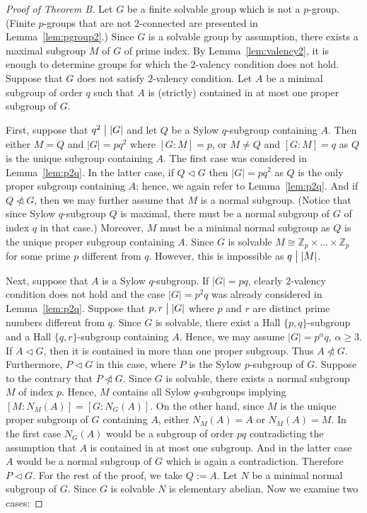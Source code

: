 \documentclass[a4paper,12pt]{article}
\theoremstyle{definition}
\theoremstyle{remark}
\theoremstyle{theorem}
\newcommand{\divides}{\bigm|}
\begin{document}
\begin{proof}[Proof of Theorem B]
  Let $G$ be a finite solvable group which is not a $p$-group. (Finite
  $p$-groups that are not $2$-connected are presented in
  Lemma~\ref{lem:pgroup2}.) Since $G$ is a solvable group by
  assumption, there exists a maximal subgroup $M$ of $G$ of prime
  index. By Lemma~\ref{lem:valency2}, it is enough to determine groups
  for which the $2$-valency condition does not hold. Suppose that $G$
  does not satisfy $2$-valency condition. Let $A$ be a minimal
  subgroup of order $q$ such that $A$ is (strictly) contained in at
  most one proper subgroup of $G$.

  First, suppose that $q^2\divides |G|$ and let $Q$ be a Sylow
  $q$-subgroup containing $A$. Then either $M=Q$ and $|G|=pq^2$ where
  $[G:M]=p$, or $M\neq Q$ and $[G:M]=q$ as $Q$ is the unique subgroup
  containing $A$. The first case was considered in
  Lemma~\ref{lem:p2q}. In the latter case, if $Q\triangleleft G$ then $|G|=pq^2$ as $Q$ is the only proper subgroup containing $A$; hence, we again refer to Lemma~\ref{lem:p2q}. And if $Q\ntriangleleft G$, then we may further assume that $M$ is a normal subgroup. (Notice that since Sylow $q$-subgroup $Q$ is maximal, there must be a normal subgroup of $G$ of index $q$ in that case.) Moreover, $M$ must be a minimal normal subgroup as $Q$ is the unique proper subgroup containing $A$. Since $G$ is solvable $M\cong\mathbb{Z}_p\times\dots\times\mathbb{Z}_p$ for some prime $p$ different from $q$. However, this is impossible as $q\divides |M|$.

  Next, suppose that $A$ is a Sylow $q$-subgroup. If $|G|=pq$, clearly
  $2$-valency condition does not hold and the case $|G|=p^2q$ was
  already considered in Lemma~\ref{lem:p2q}. Suppose that
  $p,r\divides |G|$ where $p$ and $r$ are distinct prime numbers different
  from $q$. Since $G$ is solvable, there exist a Hall
  $\{p,q\}$-subgroup and a Hall $\{q,r\}$-subgroup containing
  $A$. Hence, we may assume $|G|=p^{\alpha}q$, $\alpha\geq 3$. If
  $A\triangleleft G$, then it is contained in more than one proper
  subgroup. Thus $A\ntriangleleft G$. Furthermore, $P\triangleleft G$ in this case, where $P$ is the Sylow $p$-subgroup of $G$. Suppose to the contrary that $P\ntriangleleft G$. Since $G$ is solvable, there exists a normal subgroup $M$ of index $p$. Hence, $M$ contains all Sylow $q$-subgroups implying $[M:N_M(A)]=[G:N_G(A)]$. On the other hand, since $M$ is the unique proper subgroup of $G$ containing $A$, either $N_M(A)=A$ or $N_M(A)=M$. In the first case $N_G(A)$ would be a subgroup of order $pq$ contradicting the assumption that $A$ is contained in at most one subgroup. And in the latter case $A$ would be a normal subgroup of $G$ which is again a contradiction. Therefore $P\triangleleft G$. For the rest of the proof, we take $Q:=A$. Let $N$ be a minimal normal subgroup of $G$. Since $G$ is solvable $N$ is elementary abelian. Now we examine two cases:


\end{proof}
\end{document}
